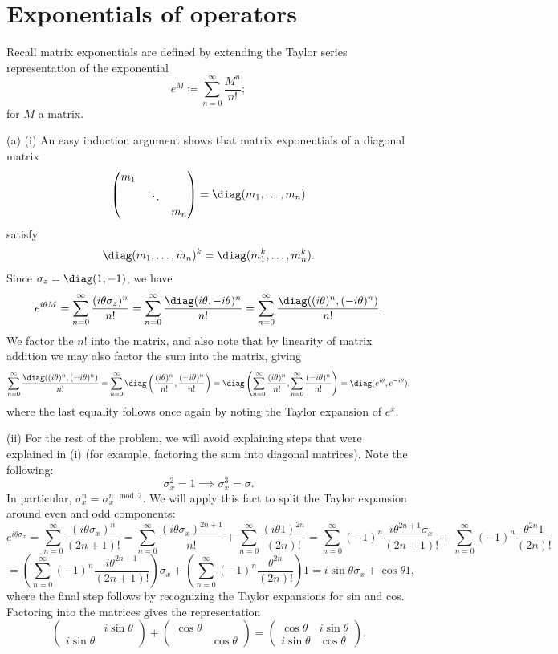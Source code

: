 \documentclass[11pt, letterpaper]{article}
\begin{document}
\section{Exponentials of operators}

Recall matrix exponentials are defined by extending the Taylor series representation of the exponential
\[
	e^M \coloneqq \sum_{n=0}^{\infty} \frac{M^n}{n!}
;\]
for $M$ a matrix.

(a) (i) An easy induction argument shows that matrix exponentials of a diagonal matrix
\[
	\begin{pmatrix}
	m_1 &  &  \\
	 & \ddots &  \\
	 &  & m_n
	\end{pmatrix} = \diag (m_1, \ldots ,m_n)
\]
satisfy
\[
	\diag (m_1, \ldots ,m_n)^k = \diag (m_1^k, \ldots ,m_n^k)
.\]
Since $\sigma _z=\diag (1,-1)$, we have
\[
	e^{i\theta M} =\sum_{n=0}^{\infty} \frac{(i\theta \sigma _z)^n}{n!} =\sum_{n=0}^{\infty} \frac{\diag (i\theta ,-i\theta )^n}{n!} =\sum_{n=0}^{\infty} \frac{\diag ((i\theta )^n,(-i\theta )^n)}{n!} 
.\]
We factor the $n!$ into the matrix, and also note that by linearity of matrix addition we may also factor the sum into the matrix, giving
\[
	\sum_{n=0}^{\infty} \frac{\diag ((i\theta )^n,(-i\theta )^n)}{n!} =\sum_{n=0}^{\infty} \diag \left( \frac{(i\theta )^n}{n!} ,\frac{(-i\theta )^n}{n!}  \right) =\diag \left( \sum_{n=0}^{\infty} \frac{(i\theta )^n}{n!} ,\sum_{n=0}^{\infty} \frac{(-i\theta )^n}{n!}  \right) =\diag (e^{i\theta } ,e^{-i\theta } )
,\]
where the last equality follows once again by noting the Taylor expansion of $e^x$.

(ii) For the rest of the problem, we will avoid explaining steps that were explained in (i) (for example, factoring the sum into diagonal matrices). Note the following:
\[
	\sigma _x^2=1 \implies \sigma _x^3=\sigma 
.\]
In particular, $\sigma _x^n=\sigma _x^{n\mod 2} $. We will apply this fact to split the Taylor expansion around even and odd components:
\[
	e^{i\theta \sigma _x} =\sum_{n=0}^{\infty} \frac{(i\theta \sigma _x)^n}{(2n+1)!} =\sum_{n=0}^{\infty} \frac{(i\theta \sigma_x )^{2n+1} }{n!} +\sum_{n=0}^{\infty} \frac{(i\theta 1)^{2n} }{(2n)!} =\sum_{n=0}^{\infty} (-1)^n \frac{i \theta ^{2n+1} \sigma_x }{(2n+1)!} +\sum_{n=0}^{\infty} (-1)^n \frac{\theta ^{2n} 1}{(2n)!} 
\]
\[
	=\left( \sum_{n=0}^{\infty} (-1)^n \frac{i \theta ^{2n+1} }{(2n+1)!}  \right) \sigma _x + \left( \sum_{n=0}^{\infty} (-1)^n\frac{\theta ^{2n} }{(2n)!}  \right) 1=i \sin \theta \sigma _x + \cos \theta 1,
\]
where the final step follows by recognizing the Taylor expansions for sin and cos. Factoring into the matrices gives the representation
\[
	\begin{pmatrix}
	 & i \sin \theta  \\
	i \sin \theta  &
	\end{pmatrix}+\begin{pmatrix}
	\cos \theta  &  \\
	 & \cos \theta 
	\end{pmatrix}=\begin{pmatrix}
	\cos \theta  & i \sin \theta  \\
	i \sin \theta  & \cos \theta 
	\end{pmatrix}
.\]
\end{document}
